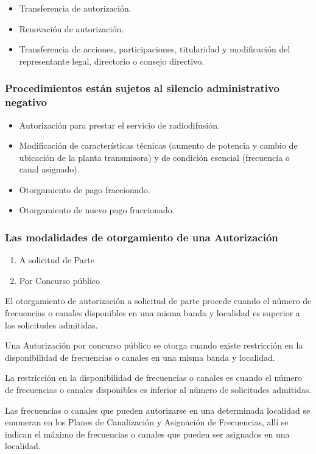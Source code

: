 \documentclass[a4paper]{IEEEtran} %
\begin{document}
\begin{itemize}
	\item Transferencia de autorización. 
	\item Renovación de autorización. 
	\item Transferencia de acciones, participaciones, 
	titularidad y modificación del representante 
	legal, directorio o consejo directivo.
\end{itemize}

\subsubsection{Procedimientos están sujetos al silencio administrativo negativo}
\begin{itemize}
	\item Autorización para prestar el servicio de 
	radiodifusión.
	\item Modificación de características técnicas 
	(aumento de potencia y cambio de ubicación de 
	la  planta  transmisora)  y  de  condición  esencial 
	(frecuencia o canal asignado). 
	\item Otorgamiento de pago fraccionado.
	\item Otorgamiento de nuevo pago fraccionado.
\end{itemize}

\subsubsection{Las modalidades de otorgamiento de una Autorización}
\begin{enumerate}
	\item A solicitud de Parte
	\item Por Concurso público
\end{enumerate}

El otorgamiento de 
autorización a solicitud de parte procede cuando el número de frecuencias o canales 
disponibles  en  una  misma  banda  y  localidad  es 
superior a las solicitudes admitidas.

Una Autorización por concurso público se otorga cuando existe restricción en la disponibilidad de 
frecuencias  o  canales  en  una  misma  banda  y 
localidad. 

La restricción en la disponibilidad de frecuencias o canales es  cuando  el  número  de  frecuencias  o  canales 
disponibles  es  inferior  al  número  de  solicitudes 
admitidas.

Las frecuencias o 
canales que pueden autorizarse en una 
determinada localidad se  enumeran  en  los  Planes  de  Canalización  y 
Asignación de Frecuencias, allí se indican el 
máximo de frecuencias o canales que pueden ser 
asignados en una localidad. 
\end{document}
